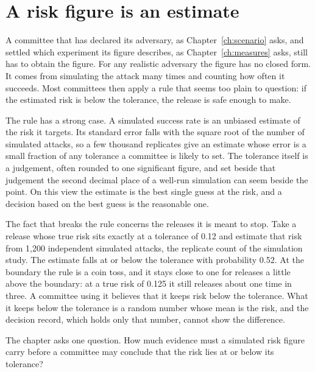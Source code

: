 \chapter{A risk figure is an estimate}\label{ch:estimate}

A committee that has declared its adversary, as Chapter~\ref{ch:scenario} asks, and
settled which experiment its figure describes, as Chapter~\ref{ch:measures} asks, still
has to obtain the figure. For any realistic adversary the figure has no closed form. It
comes from simulating the attack many times and counting how often it succeeds. Most
committees then apply a rule that seems too plain to question: if the estimated risk is
below the tolerance, the release is safe enough to make.

The rule has a strong case. A simulated success rate is an unbiased estimate of the
risk it targets. Its standard error falls with the square root of the number of
simulated attacks, so a few thousand replicates give an estimate whose error is a small
fraction of any tolerance a committee is likely to set. The tolerance itself is a
judgement, often rounded to one significant figure, and set beside that judgement the
second decimal place of a well-run simulation can seem beside the point. On this view the
estimate is the best single guess at the risk, and a decision based on the best guess is
the reasonable one.

The fact that breaks the rule concerns the releases it is meant to stop. Take a release
whose true risk sits exactly at a tolerance of 0.12 and estimate that risk from 1,200
independent simulated attacks, the replicate count of the simulation study. The
estimate falls at or below the tolerance with probability 0.52.
At the boundary the rule is a coin toss, and it stays close to one for releases a little
above the boundary: at a true risk of 0.125 it still releases about one time in three.
A committee using it believes that it keeps risk below the tolerance. What it keeps
below the tolerance is a random number whose mean is the risk, and the decision record,
which holds only that number, cannot show the difference.

The chapter asks one question. How much evidence must a simulated risk figure carry
before a committee may conclude that the risk lies at or below its tolerance?

